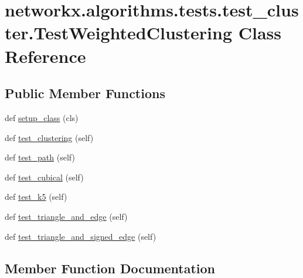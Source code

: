 \hypertarget{classnetworkx_1_1algorithms_1_1tests_1_1test__cluster_1_1TestWeightedClustering}{}\section{networkx.\+algorithms.\+tests.\+test\+\_\+cluster.\+Test\+Weighted\+Clustering Class Reference}
\label{classnetworkx_1_1algorithms_1_1tests_1_1test__cluster_1_1TestWeightedClustering}
\subsection*{Public Member Functions}
\begin{DoxyCompactItemize}
\item 
def \hyperlink{classnetworkx_1_1algorithms_1_1tests_1_1test__cluster_1_1TestWeightedClustering_ac635f5edf7c17a0ad303ce53a5c21144}{setup\+\_\+class} (cls)
\item 
def \hyperlink{classnetworkx_1_1algorithms_1_1tests_1_1test__cluster_1_1TestWeightedClustering_abdffda09100ba849cc2311c5ca9b439a}{test\+\_\+clustering} (self)
\item 
def \hyperlink{classnetworkx_1_1algorithms_1_1tests_1_1test__cluster_1_1TestWeightedClustering_ae51c733d4e90bc836a7e18a4d9aadd93}{test\+\_\+path} (self)
\item 
def \hyperlink{classnetworkx_1_1algorithms_1_1tests_1_1test__cluster_1_1TestWeightedClustering_aea4c331f891cc276fd983a1c254c7e73}{test\+\_\+cubical} (self)
\item 
def \hyperlink{classnetworkx_1_1algorithms_1_1tests_1_1test__cluster_1_1TestWeightedClustering_a17fe3459c5a80725053c0e5580bd90b9}{test\+\_\+k5} (self)
\item 
def \hyperlink{classnetworkx_1_1algorithms_1_1tests_1_1test__cluster_1_1TestWeightedClustering_a185e7a0d96f85753daa94ff3d14d0686}{test\+\_\+triangle\+\_\+and\+\_\+edge} (self)
\item 
def \hyperlink{classnetworkx_1_1algorithms_1_1tests_1_1test__cluster_1_1TestWeightedClustering_a76f2b7ef09b995c99a5191e680b7ffb7}{test\+\_\+triangle\+\_\+and\+\_\+signed\+\_\+edge} (self)
\end{DoxyCompactItemize}


\subsection{Member Function Documentation}
\mbox{\label{classnetworkx_1_1algorithms_1_1tests_1_1test__cluster_1_1TestWeightedClustering_ac635f5edf7c17a0ad303ce53a5c21144}} 
